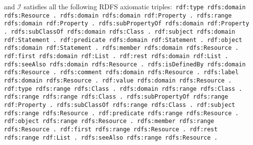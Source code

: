 \documentclass{article}
\begin{document}
\begin{defin}
\begin{itemize}
\end{itemize}
and $\mathcal{I}$ satisfies all the following RDFS axiomatic triples:\newline\texttt{
rdf:type rdfs:domain rdfs:Resource . \newline
rdfs:domain rdfs:domain rdf:Property . \newline
rdfs:range rdfs:domain rdf:Property . \newline
rdfs:subPropertyOf rdfs:domain rdf:Property . \newline
rdfs:subClassOf rdfs:domain rdfs:Class . \newline
rdf:subject rdfs:domain rdf:Statement . \newline
rdf:predicate rdfs:domain rdf:Statement . \newline
rdf:object rdfs:domain rdf:Statement . \newline
rdfs:member rdfs:domain rdfs:Resource . \newline
rdf:first rdfs:domain rdf:List . \newline
rdf:rest rdfs:domain rdf:List . \newline
rdfs:seeAlso rdfs:domain rdfs:Resource . \newline
rdfs:isDefinedBy rdfs:domain rdfs:Resource . \newline
rdfs:comment rdfs:domain rdfs:Resource . \newline
rdfs:label rdfs:domain rdfs:Resource . \newline
rdf:value rdfs:domain rdfs:Resource . \newline
\newline
rdf:type rdfs:range rdfs:Class . \newline
rdfs:domain rdfs:range rdfs:Class . \newline
rdfs:range rdfs:range rdfs:Class .\newline
rdfs:subPropertyOf rdfs:range rdf:Property .\newline
rdfs:subClassOf rdfs:range rdfs:Class .\newline
rdf:subject rdfs:range rdfs:Resource .\newline
rdf:predicate rdfs:range rdfs:Resource .\newline
rdf:object rdfs:range rdfs:Resource .\newline
rdfs:member rdfs:range rdfs:Resource .\newline
rdf:first rdfs:range rdfs:Resource .\newline
rdf:rest rdfs:range rdf:List .\newline
rdfs:seeAlso rdfs:range rdfs:Resource .\newline
}
\end{defin}
\end{document}
